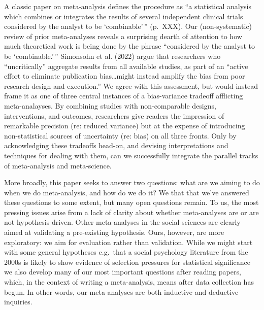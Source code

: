 \documentclass[
  man]{apa6}
\begin{document}
A classic paper on meta-analysis defines the procedure as ``a statistical analysis which combines or integrates the results of several independent clinical trials considered by the analyst to be `combinable'\,'' (p.~XXX). Our (non-systematic) review of prior meta-analyses reveals a surprising dearth of attention to how much theoretical work is being done by the phrase ``considered by the analyst to be `combinable.'\,'' Simonsohn et al. (2022) argue that researchers who ``uncritically'' aggregate results from all available studies, as part of an ``active effort to eliminate publication bias\ldots might instead amplify the bias from poor research design and execution.'' We agree with this assessment, but would instead frame it as one of three central instances of a bias-variance tradeoff afflicting meta-analayses. By combining studies with non-comparable designs, interventions, and outcomes, researchers give readers the impression of remarkable precision (re: reduced variance) but at the expense of introducing non-statistical sources of uncertainty (re: bias) on all three fronts. Only by acknowledging these tradeoffs head-on, and devising interpretations and techniques for dealing with them, can we successfully integrate the parallel tracks of meta-analysis and meta-science.

More broadly, this paper seeks to answer two questions: what are we aiming to do when we do meta-analysis, and how do we do it? We that that we've answered these questions to some extent, but many open questions remain. To us, the most pressing issues arise from a lack of clarity about whether meta-analyses are or are not hypothesis-driven. Other meta-analyses in the social sciences are clearly aimed at validating a pre-existing hypothesis. Ours, however, are more exploratory: we aim for evaluation rather than validation. While we might start with some general hypotheses \textemdash e.g.~that a social psychology literature from the 2000s is likely to show evidence of selection pressures for statistical significance \textemdash we also develop many of our most important questions after reading papers, which, in the context of writing a meta-analysis, means after data collection has begun. In other words, our meta-analyses are both inductive and deductive inquiries.
\end{document}
